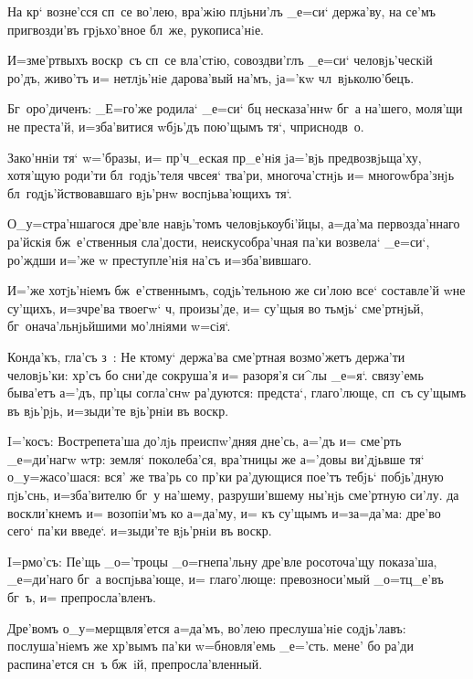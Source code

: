 На кр` возне'сся сп~се во'лею, вра'жiю плjьни'лъ 
_е=си` держа'ву, на се'мъ пригвозди'въ грjьхо'вное бл~же, 
рукописа'нiе.

И=з\ъ ме'ртвыхъ воскр~съ сп~се вла'стiю, совоздви'глъ 
_е=си` человjь'ческiй ро'дъ, живо'тъ и= нетлjь'нiе 
дарова'вый на'мъ, jа='кw чл~вjьколю'бецъ.

Бг~оро'диченъ: _Е=го'же родила` _е=си` бц 
несказа'ннw бг~а на'шего, моля'щи не преста'й, 
и=зба'витися w\т бjь'дъ пою'щымъ тя`, ч приснодв~о.


Зако'ннiи тя` w='бразы, и= пр'ч_еская 
пр_е'нiя jа='вjь предвозвjьща'ху, хотя'щую роди'ти 
бл~годjь'теля ч всея` тва'ри, многоча'стнjь и= 
многоwбра'знjь бл~годjь'йствовавшаго вjь'рнw 
воспjьва'ющихъ тя`.

О_у=стра'ншагося дре'вле навjь'томъ человjькоубi'йцы, 
а=да'ма первозда'ннаго ра'йскiя бж~е'ственныя сла'дости, 
неискусобра'чная па'ки возвела` _е=си`, ро'ждши и='же w\т 
преступле'нiя на'съ и=зба'вившаго.

И='же хотjь'нiемъ бж~е'ственнымъ, содjь'тельною же 
си'лою все` составле'й w\т не су'щихъ, и=з\ъ чре'ва 
твоегw` ч, произы'де, и= су'щыя во тьмjь` 
сме'ртнjьй, бг~онача'льнjьйшими мо'лнiями w=сiя`.

Конда'къ, гла'съ з~: Не ктому` держа'ва сме'ртная 
возмо'жетъ держа'ти человjь'ки: хр'съ бо сни'де 
сокруша'я и= разоря'я си^лы _е=я`. связу'емь быва'етъ 
а='дъ, пр'цы согла'снw ра'дуются: предста`, 
глаго'люще, сп~съ су'щымъ въ вjь'рjь, и=зыди'те вjь'рнiи 
въ воскр.

I='косъ: Вострепета'ша до'лjь преиспw'дняя дне'сь, 
а='дъ и= сме'рть _е=ди'нагw w\т тр: земля` 
поколеба'ся, вра'тницы же а='довы ви'дjьвше тя` 
о_у=жасо'шася: вся' же тва'рь со пр'ки ра'дующися 
пое'тъ тебjь` побjь'дную пjь'снь, и=зба'вителю бг~у 
на'шему, разруши'вшему ны'нjь сме'ртную си'лу. да 
воскли'кнемъ и= возопiи'мъ ко а=да'му, и= къ су'щымъ 
и=з\ъ а=да'ма: дре'во сего` па'ки введе`. и=зыди'те 
вjь'рнiи въ воскр.


I=рмо'съ: Пе'щь _о='троцы _о=гнепа'льну дре'вле 
росоточа'щу показа'ша, _е=ди'наго бг~а воспjьва'юще, и= 
глаго'люще: превозноси'мый _о=тц_е'въ бг~ъ, и= 
препросла'вленъ.

Дре'вомъ о_у=мерщвля'ется а=да'мъ, во'лею преслуша'нiе 
содjь'лавъ: послуша'нiемъ же хр'вымъ па'ки 
w=бновля'емь _е='сть. мене' бо ра'ди распина'ется сн~ъ 
бж~iй, препросла'вленный.

